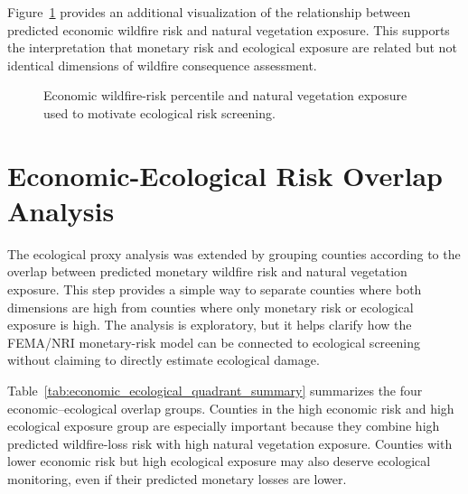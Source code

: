 Figure~\ref{fig:economic_ecological_risk_quadrants_notebook7} provides an additional visualization of the relationship between predicted economic wildfire risk and natural vegetation exposure. This supports the interpretation that monetary risk and ecological exposure are related but not identical dimensions of wildfire consequence assessment.

\begin{figure}[htbp]
    \centering
    \caption{Economic wildfire-risk percentile and natural vegetation exposure used to motivate ecological risk screening.}
    \label{fig:economic_ecological_risk_quadrants_notebook7}
\end{figure}

\section{Economic-Ecological Risk Overlap Analysis}
\label{sec:economic_ecological_overlap}

The ecological proxy analysis was extended by grouping counties according to the overlap between predicted monetary wildfire risk and natural vegetation exposure. This step provides a simple way to separate counties where both dimensions are high from counties where only monetary risk or ecological exposure is high. The analysis is exploratory, but it helps clarify how the FEMA/NRI monetary-risk model can be connected to ecological screening without claiming to directly estimate ecological damage.

Table~\ref{tab:economic_ecological_quadrant_summary} summarizes the four economic--ecological overlap groups. Counties in the high economic risk and high ecological exposure group are especially important because they combine high predicted wildfire-loss risk with high natural vegetation exposure. Counties with lower economic risk but high ecological exposure may also deserve ecological monitoring, even if their predicted monetary losses are lower.


